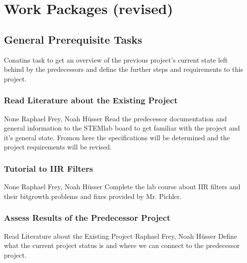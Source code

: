 \documentclass[a4paper,oneside]{alpenspecs/alpenspecs}
\begin{document}
\chapter{Work Packages (revised)} %
\label{ch:wpac}


\section{General Prerequisite Tasks}
\label{sec:general}

Conatins task to get an overview of the previous project's current state left behind by the predecessors and define the further steps and requirements to this project.

\subsection{Read Literature about the Existing Project}
\label{subsec:general:read}

\wpac
    {}
    {}
    {}
    {None}
    {}
    {Raphael Frey, Noah Hüsser}
    {%
        Read the predecessor documentation and general information to the STEMlab board to get familiar with the project and it's general state.
        Fromon here the specifications will be determined and the project requirements will be revised.
    }

\subsection{Tutorial to IIR Filters}
\label{subsec:general:iir}

\wpac
    {}
    {}
    {}
    {None}
    {}
    {Raphael Frey, Noah Hüsser}
    {%
        Complete the lab course about IIR filters and their bitgrowth problems and fixes provided by Mr. Pichler.
    }

\subsection{Assess Results of the Predecessor Project}
\label{subsec:general:assess}

\wpac
    {}
    {}
    {}
    {Read Literature about the Existing Project}
    {}
    {Raphael Frey, Noah Hüsser}
    {%
        Define what the current project status is and where we can connect to the predecessor project.
    }
\end{document}
